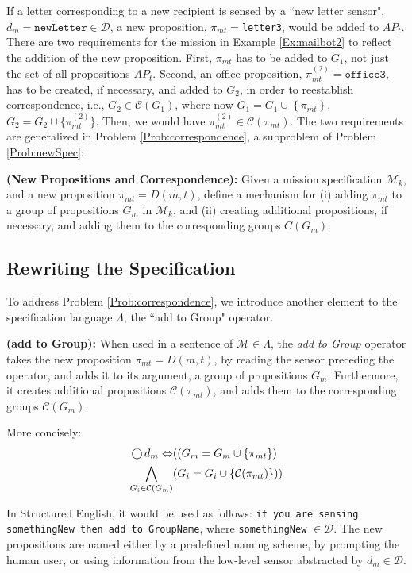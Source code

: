If a letter corresponding to a new recipient is sensed by a ``new letter sensor", $d_{m} = \texttt{newLetter} \in \mathcal{D}$, a new proposition, $\pi_{mt} = $\texttt{letter3}, would be added to $AP_t$. 
There are two requirements for the mission in Example \ref{Ex:mailbot2} to reflect the addition of the new proposition. 
First, $\pi_{mt}$ has to be added to $G_1$, not just the set of all propositions $AP_t$. 
Second, an office proposition, $\pi_{mt}^{(2)} = \texttt{office3}$, has to be created, if necessary, and added to $G_2$, in order to reestablish correspondence, i.e., $G_2 \in \mathcal{C}(G_1)$, where now $G_{1} = G_1 \cup \left\{ \pi_{mt} \right\}$, $G_{2} = G_2 \cup \{ \pi_{mt}^{(2)} \}$. 
Then, we would have $\pi_{mt}^{(2)} \in \mathcal{C}(\pi_{mt})$. 
The two requirements are generalized in Problem \ref{Prob:correspondence}, a subproblem of Problem \ref{Prob:newSpec}:

\begin{myProblem}\label{Prob:correspondence}
	\textbf{(New Propositions and Correspondence):} Given a mission specification $\mathcal{M}_k$, and a new proposition $\pi_{mt} = D(m, t)$, define a mechanism for (i) adding $\pi_{mt}$ to a group of propositions $G_m$ in $\mathcal{M}_k$, and (ii) creating additional propositions, if necessary, and adding them to the corresponding groups $C(G_m)$.
\end{myProblem}

\subsection{Rewriting the Specification} %

To address Problem \ref{Prob:correspondence}, we introduce another element to the specification language $\Lambda$, the ``add to Group" operator.

\begin{myDefinition}\label{Def:addto}
	\textbf{(add to Group):} When used in a sentence of $\mathcal{M} \in \Lambda$, the \emph{add to Group} operator takes the new proposition $\pi_{mt} = D(m,t)$, by reading the sensor preceding the operator, and adds it to its argument, a group of propositions $G_m$. 
	Furthermore, it creates additional propositions $\mathcal{C}(\pi_{mt})$, and adds them to the corresponding groups $\mathcal{C}(G_m)$. 
	
	More concisely:
	\begin{equation}
	\begin{split}
		\operatorname{\bigcirc} d_m \Leftrightarrow &((G_m = G_m \cup \left\{ \pi_{mt} \right\}) \\
		\bigwedge_{G_i \in \mathcal{C}(G_m)} &(G_i = G_i \cup \left\{ \mathcal{C}(\pi_{mt}) \right\}))
	\end{split}
	\end{equation}
\end{myDefinition}
In Structured English, it would be used as follows: \texttt{if you are sensing somethingNew then add to GroupName}, where \texttt{somethingNew} $\in \mathcal{D}$. The new propositions are named either by a predefined naming scheme, by prompting the human user, or using information from the low-level sensor abstracted by $d_m \in \mathcal{D}$.

